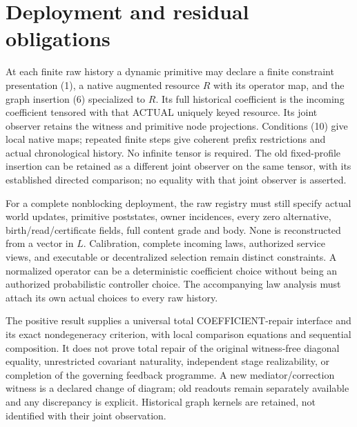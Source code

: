 \documentclass[11pt]{article}
\begin{document}
\section{Deployment and residual obligations}
At each finite raw history a dynamic primitive may declare a finite constraint presentation (1), a native augmented resource $R$ with its operator map, and the graph insertion (6) specialized to $R$. Its full historical coefficient is the incoming coefficient tensored with that ACTUAL uniquely keyed resource. Its joint observer retains the witness and primitive node projections. Conditions (10) give local native maps; repeated finite steps give coherent prefix restrictions and actual chronological history. No infinite tensor is required. The old fixed-profile insertion can be retained as a different joint observer on the same tensor, with its established directed comparison; no equality with that joint observer is asserted.

For a complete nonblocking deployment, the raw registry must still specify actual world updates, primitive poststates, owner incidences, every zero alternative, birth/read/certificate fields, full content grade and body. None is reconstructed from a vector in $L$. Calibration, complete incoming laws, authorized service views, and executable or decentralized selection remain distinct constraints. A normalized operator can be a deterministic coefficient choice without being an authorized probabilistic controller choice. The accompanying law analysis must attach its own actual choices to every raw history.

The positive result supplies a universal total COEFFICIENT-repair interface and its exact nondegeneracy criterion, with local comparison equations and sequential composition. It does not prove total repair of the original witness-free diagonal equality, unrestricted covariant naturality, independent stage realizability, or completion of the governing feedback programme. A new mediator/correction witness is a declared change of diagram; old readouts remain separately available and any discrepancy is explicit. Historical graph kernels are retained, not identified with their joint observation.
\end{document}
